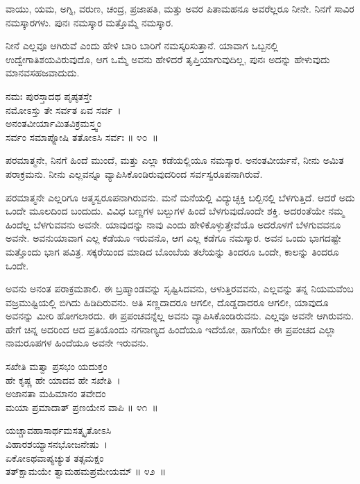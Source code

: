 \begin{artha}
ವಾಯು, ಯಮ, ಅಗ್ನಿ, ವರುಣ, ಚಂದ್ರ, ಪ್ರಜಾಪತಿ, ಮತ್ತು ಅವರ ಪಿತಾಮಹನೂ ಅವರೆಲ್ಲರೂ ನೀನೇ. ನಿನಗೆ ಸಾವಿರ ನಮಸ್ಕಾರಗಳು. ಪುನಃ ನಮಸ್ಕಾರ ಮತ್ತೊಮ್ಮೆ ನಮಸ್ಕಾರ.
\end{artha}

ನೀನೆ ಎಲ್ಲವೂ ಆಗಿರುವೆ ಎಂದು ಹೇಳಿ ಬಾರಿ ಬಾರಿಗೆ ನಮಸ್ಕರಿಸುತ್ತಾನೆ. ಯಾವಾಗ ಒಬ್ಬನಲ್ಲಿ ಉದ್ವೇಗಾತಿಶಯವಿರುವುದೊ, ಆಗ ಒಮ್ಮೆ ಅವನು ಹೇಳಿದರೆ ತೃಪ್ತಿಯಾಗುವುದಿಲ್ಲ, ಪುನಃ ಅದನ್ನು ಹೇಳುವುದು ಮಾನವಸಹಜವಾದುದು.

\begin{shloka}
ನಮಃ ಪುರಸ್ತಾದಥ ಪೃಷ್ಠತಸ್ತೇ \\ ನಮೋಽಸ್ತು ತೇ ಸರ್ವತ ಏವ ಸರ್ವ~।\\ ಅನಂತವೀರ್ಯಾಮಿತವಿಕ್ರಮಸ್ತ್ವಂ \\ ಸರ್ವಂ ಸಮಾಪ್ನೋಷಿ ತತೋಽಸಿ ಸರ್ವಃ \hfill॥ ೪೦~॥
\end{shloka}

\begin{artha}
ಪರಮಾತ್ಮನೇ, ನಿನಗೆ ಹಿಂದೆ ಮುಂದೆ, ಮತ್ತು ಎಲ್ಲಾ ಕಡೆಯಲ್ಲಿಯೂ ನಮಸ್ಕಾರ. ಅನಂತವೀರ್ಯನೆ, ನೀನು ಅಮಿತ ಪರಾಕ್ರಮನು. ನೀನು ಎಲ್ಲವನ್ನೂ ವ್ಯಾಪಿಸಿಕೊಂಡಿರುವುದರಿಂದ ಸರ್ವಸ್ವರೂಪ\-ನಾಗಿರುವೆ.
\end{artha}

ಪರಮಾತ್ಮನೇ ಎಲ್ಲರಿಗೂ ಆತ್ಮಸ್ವರೂಪನಾಗಿರುವನು. ಮನೆ ಮನೆಯಲ್ಲಿ ವಿದ್ಯುಚ್ಛಕ್ತಿ ಬಲ್ಬಿನಲ್ಲಿ ಬೆಳಗುತ್ತಿದೆ. ಆದರೆ ಅದು ಒಂದೇ ಮೂಲದಿಂದ ಬಂದುದು. ವಿವಿಧ ಬಣ್ಣಗಳ ಬಲ್ಬುಗಳ ಹಿಂದೆ ಬೆಳಗುವುದೊಂದೇ ಶಕ್ತಿ. ಅದರಂತೆಯೇ ನಮ್ಮ ಹಿಂದೆಲ್ಲ ಬೆಳಗುವವನು ಅವನೇ. ಯಾವು\-ದನ್ನು ನಾವು ಎಂದು ಹೇಳಿಕೊಳ್ಳುತ್ತೇವೆಯೊ ಅದರೊಳಗೆ ಬೆಳಗುವವನೂ ಅವನೇ. ಅವನು\break ಯಾವಾಗ ಎಲ್ಲ ಕಡೆಯೂ ಇರುವನೊ, ಆಗ ಎಲ್ಲ ಕಡೆಗೂ ನಮಸ್ಕಾರ. ಅವನ ಒಂದು ಭಾಗದಷ್ಟೇ ಮತ್ತೊಂದು ಭಾಗ ಪವಿತ್ರ. ಸಕ್ಕರೆಯಿಂದ ಮಾಡಿದ ಬೊಂಬೆಯ ತಲೆಯನ್ನು ತಿಂದರೂ ಒಂದೇ, ಕಾಲನ್ನು ತಿಂದರೂ ಒಂದೇ.

ಅವನು ಅನಂತ ಪರಾಕ್ರಮಶಾಲಿ. ಈ ಬ್ರಹ್ಮಾಂಡವನ್ನು ಸೃಷ್ಟಿಸಿದವನು, ಆಳುತ್ತಿರವವನು, ಎಲ್ಲವನ್ನು ತನ್ನ ನಿಯಮವೆಂಬ ವಜ್ರಮುಷ್ಟಿಯಲ್ಲಿ ಬಿಗಿದು ಹಿಡಿದಿರುವನು. ಅತಿ ಸಣ್ಣದಾದರೂ ಆಗಲೀ, ದೊಡ್ಡದಾದರೂ ಆಗಲೀ, ಯಾವುದೂ ಅವನನ್ನು ಮೀರಿ ಹೋಗಲಾರದು. ಈ ಪ್ರಪಂಚವನ್ನೆಲ್ಲ ಅವನು ವ್ಯಾಪಿಸಿಕೊಂಡಿರುವನು. ಎಲ್ಲವೂ ಅವನೇ ಆಗಿರುವನು. ಹೇಗೆ ಚಿನ್ನ ಅದರಿಂದ ಆದ ಪ್ರತಿಯೊಂದು ನಗನಾಣ್ಯದ ಹಿಂದೆಯೂ ಇದೆಯೋ, ಹಾಗೆಯೇ ಈ ಪ್ರಪಂಚದ ಎಲ್ಲಾ ನಾಮರೂಪಗಳ ಹಿಂದೆಯೂ ಅವನೇ ಇರುವನು.

\begin{shloka}
ಸಖೇತಿ ಮತ್ವಾ ಪ್ರಸಭಂ ಯದುಕ್ತಂ \\ ಹೇ ಕೃಷ್ಣ ಹೇ ಯಾದವ ಹೇ ಸಖೇತಿ~।\\ಅಜಾನತಾ ಮಹಿಮಾನಂ ತವೇದಂ \\ ಮಯಾ ಪ್ರಮಾದಾತ್ ಪ್ರಣಯೇನ ವಾಪಿ \hfill॥ ೪೧~॥
\end{shloka}

\begin{shloka}
ಯಚ್ಚಾವಹಾಸಾರ್ಥಮಸತ್ಕೃತೋಽಸಿ \\ ವಿಹಾರಶಯ್ಯಾಸನಭೋಜನೇಷು~।\\ಏಕೋಽಥವಾಪ್ಯಚ್ಯುತ ತತ್ಸಮಕ್ಷಂ \\ ತತ್‌ಕ್ಷಾಮಯೇ ತ್ವಾಮಹಮಪ್ರಮೇಯಮ್ \hfill॥ ೪೨~॥
\end{shloka}

